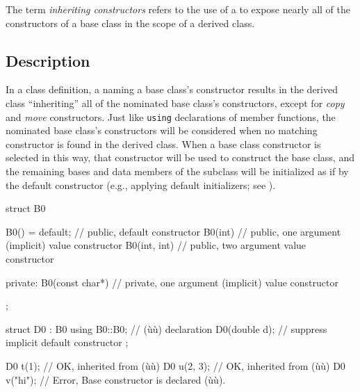
\label{inheriting-constructors}
\setcounter{table}{0}
\setcounter{footnote}{0}
\setcounter{lstlisting}{0}



The term \emph{inheriting constructors} refers to the use of a
 to expose nearly all of the
constructors of a base class in the scope of a derived class.

\subsection[Description]{Description}\label{description-inheritingctor}

In a class definition, a  naming a
base class's constructor results in the derived class ``inheriting'' all
of the nominated base class's constructors, except for \emph{copy} and
\emph{move} constructors. Just like \lstinline!using! declarations of member functions, the nominated base class's
constructors will be considered when no matching constructor is found in
the derived class. When a base class constructor is selected in this way,
that constructor will be used to construct the base class, and the
remaining bases and data members of the subclass will be initialized as
if by the default constructor (e.g., applying default initializers;
see ).

\begin{emcppslisting}[emcppsbatch=e1]
struct B0
{
    B0() = default;      // public, default constructor
    B0(int)         { }  // public, one argument (implicit) value constructor
    B0(int, int)    { }  // public, two argument value constructor

private:
    B0(const char*) { }  // private, one argument (implicit) value constructor
};

struct D0 : B0
{
    using B0::B0;  // (ù{}ù) declaration
    D0(double d);  // suppress implicit default constructor
};

D0 t(1);     // OK, inherited from (ù{}ù)
D0 u(2, 3);  // OK, inherited from (ù{}ù)
D0 v("hi");  // Error, Base constructor is declared (ù{}ù).
\end{emcppslisting}
    
